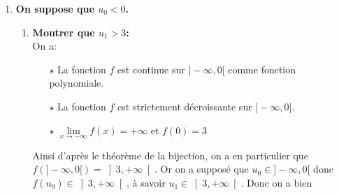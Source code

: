 \begin{correction}
\begin{enumerate}
\begin{enumerate}
\begin{itemize}
\end{itemize}
\item \textbf{\'Etudier la monotonie de la suite $\suiteu$:}\\
\noindent Soit $n\in\N$, on a: $u_{n+1}-u_n=f(u_n)-u_n=g(u_n)$. Ainsi comme le signe de $g$ est positif sur $\R$, on obtient que pour tout $n\in\N$: $u_{n+1}-u_n\geq 0$. Ainsi 
\item \textbf{\'Etudier le comportement \`{a} l'infini de la suite $\suiteu$:}
\begin{itemize}
\item[$\star$] La suite $\suiteu$ est croissante donc d'apr\`{e}s le th\'eor\`{e}me sur les suites monotones, elle converge ou elle diverge vers $+\infty$.
\item[$\star$] On suppose par l'absurde que la suite $\suiteu$ converge vers un r\'eel $l$. On a alors:
\begin{itemize}
\item[$\circ$] La suite $\suiteu$ converge vers $l$.
\item[$\circ$] Comme la suite $\suiteu$ est croissante, on a pour tout $n\in\N$: $u_n\geq u_0$.
\end{itemize}
D'apr\`{e}s le th\'eor\`{e}me de passage \`{a} la limite, on obtient donc que: $l\geq u_0$. Or par hypoth\`{e}se, on sait que $u_0>3$. Ainsi on obtient que: $l>3$. Absurde car la seule limite \'eventuelle de la suite $\suiteu$ est 3. Ainsi 
\end{itemize}
\end{enumerate} 
\item \textbf{On suppose que $u_0<0$.}
\begin{enumerate}
\item \textbf{Montrer que $u_1>3$:}\\
\noindent On a:
\begin{itemize}
\item[$\star$] La fonction $f$ est continue sur $\rbrack -\infty,0\lbrack$ comme fonction polynomiale.
\item[$\star$] La fonction $f$ est strictement d\'ecroissante sur $\rbrack -\infty,0\lbrack$.
\item[$\star$] $\lim\limits_{x\to -\infty}f(x)=+\infty$ et $f(0)=3$
\end{itemize}
Ainsi d'apr\`{e}s le th\'eor\`{e}me de la bijection, on a en particulier que $f(\rbrack -\infty,0\lbrack)=\left\rbrack 3,+\infty\right\lbrack$. Or on a suppos\'e que $u_0\in\rbrack -\infty,0\lbrack$ donc $f(u_0)\in \left\rbrack 3,+\infty\right\lbrack$, \`{a} savoir $u_1\in \left\rbrack 3,+\infty\right\lbrack$. Donc on a bien 

\end{enumerate}
\end{enumerate}
\end{correction}
